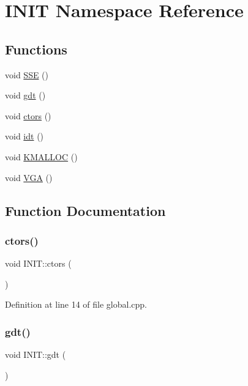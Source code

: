 \hypertarget{namespace_i_n_i_t}{}\section{I\+N\+IT Namespace Reference}
\label{namespace_i_n_i_t}
\subsection*{Functions}
\begin{DoxyCompactItemize}
\item 
void \hyperlink{namespace_i_n_i_t_a8928ddbb4ca671dfe1c740da380fa0c4}{S\+SE} ()
\item 
void \hyperlink{namespace_i_n_i_t_a3462d7bc51bce77cc240d05b62b1b777}{gdt} ()
\item 
void \hyperlink{namespace_i_n_i_t_a6608557e41ad37cdb4a408e2f05c9783}{ctors} ()
\item 
void \hyperlink{namespace_i_n_i_t_aec8e9f01cb09653075b6e610096b3ca9}{idt} ()
\item 
void \hyperlink{namespace_i_n_i_t_ac811302ce0948a6a097b445b811f9c14}{K\+M\+A\+L\+L\+OC} ()
\item 
void \hyperlink{namespace_i_n_i_t_abae5789d80f8edd37455f3b167779654}{V\+GA} ()
\end{DoxyCompactItemize}


\subsection{Function Documentation}
\mbox{\label{namespace_i_n_i_t_a6608557e41ad37cdb4a408e2f05c9783}} 
\subsubsection{\texorpdfstring{ctors()}{ctors()}}
{\footnotesize\ttfamily void I\+N\+I\+T\+::ctors (\begin{DoxyParamCaption}{ }\end{DoxyParamCaption})}



Definition at line 14 of file global.\+cpp.

\mbox{\label{namespace_i_n_i_t_a3462d7bc51bce77cc240d05b62b1b777}} 
\subsubsection{\texorpdfstring{gdt()}{gdt()}}
{\footnotesize\ttfamily void I\+N\+I\+T\+::gdt (\begin{DoxyParamCaption}{ }\end{DoxyParamCaption})}



